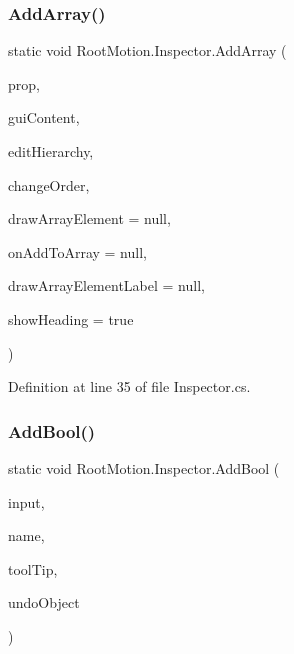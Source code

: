 \subsubsection{\texorpdfstring{Add\+Array()}{AddArray()}}
{\footnotesize\ttfamily static void Root\+Motion.\+Inspector.\+Add\+Array (\begin{DoxyParamCaption}\item[{Serialized\+Property}]{prop,  }\item[{G\+U\+I\+Content}]{gui\+Content,  }\item[{bool}]{edit\+Hierarchy,  }\item[{bool}]{change\+Order,  }\item[{\mbox{\hyperlink{class_root_motion_1_1_inspector_a369c57a74b02e7f38059b2bb5e7ef36c}{Draw\+Array\+Element}}}]{draw\+Array\+Element = {\ttfamily null},  }\item[{\mbox{\hyperlink{class_root_motion_1_1_inspector_a0d030b75017c7036643fb9d039ed39d7}{On\+Add\+To\+Array}}}]{on\+Add\+To\+Array = {\ttfamily null},  }\item[{\mbox{\hyperlink{class_root_motion_1_1_inspector_aa060038e590bda971023ece8f2945330}{Draw\+Array\+Element\+Label}}}]{draw\+Array\+Element\+Label = {\ttfamily null},  }\item[{bool}]{show\+Heading = {\ttfamily true} }\end{DoxyParamCaption})\hspace{0.3cm}{\ttfamily [static]}}



Definition at line 35 of file Inspector.\+cs.

\mbox{\label{class_root_motion_1_1_inspector_aefa27a7b1823b0db16208072d3d10789}} 
\subsubsection{\texorpdfstring{Add\+Bool()}{AddBool()}}
{\footnotesize\ttfamily static void Root\+Motion.\+Inspector.\+Add\+Bool (\begin{DoxyParamCaption}\item[{ref bool}]{input,  }\item[{string}]{name,  }\item[{string}]{tool\+Tip,  }\item[{\mbox{\hyperlink{_quads_8cs_aef19bab18b9814edeef255c43e4f6bbc}{Object}}}]{undo\+Object }\end{DoxyParamCaption})\hspace{0.3cm}{\ttfamily [static]}}



